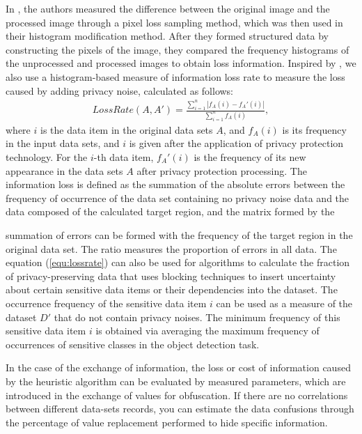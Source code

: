 \documentclass[trans]{IEEEtran}
\newcommand{\el}[1]{{\color{black}#1}}
\begin{document}
In \cite{tai2009reversible}, the authors measured the difference between the original image and the processed image through a pixel loss sampling method, which was then used in their histogram modification method. After they formed structured data by constructing the pixels of the image, they compared the frequency histograms of the unprocessed and processed images to obtain loss information.
Inspired by \cite{tai2009reversible}, we also use a histogram-based measure of information loss rate to measure the loss caused by adding privacy noise, calculated as follows:
\begin{eqnarray} \label{equ:lossrate}
LossRate(A,A')= \frac{\sum_{i=1}^n |f_A (i)-f_A' (i)|}{ \sum_{i=1}^n f_A (i)},
\end{eqnarray}
where $i$ is the data item in the original data sets $A$, and $ f_A (i) $ is its frequency in the input data sets, and $i$ is given after the application of privacy protection technology. For the $i$-th data item, $ f_A '(i) $ is the frequency of its new appearance in the data sets $A$ after privacy protection processing. 
The information loss is defined as the summation of the absolute errors between the frequency of occurrence of the data set containing no privacy noise data and the data composed of the calculated target region, and the matrix formed by the \el{ summation  of errors can be formed with the frequency of the target region in the original data set. The ratio measures the proportion of errors in all data. The equation (\ref{equ:lossrate}) can also be used for algorithms to calculate the fraction of privacy-preserving data that uses blocking techniques to insert uncertainty about certain sensitive data items or their dependencies into the dataset. The occurrence frequency of the sensitive data item $i$ can be used as a measure of the dataset $D'$ that do not contain privacy noises.
The minimum frequency of this sensitive data item $i$ is obtained via averaging the maximum frequency of occurrences of sensitive classes in the object detection task.

In the case of the exchange of information, the loss or cost of information caused by the heuristic algorithm can be evaluated by measured parameters, which are introduced in the exchange of values for obfuscation. If there are no correlations between different data-sets records, you can estimate the data confusions through the percentage of value replacement performed to hide specific information.}
\end{document}

